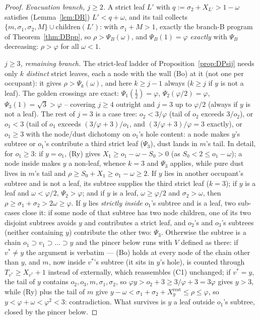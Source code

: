 \documentclass[11pt]{article}
\theoremstyle{definition}
\begin{document}
\begin{proof}
\emph{Evacuation branch, $j\ge2$.} A strict leaf $L'$ with
$q:=\sigma_2+X_{L'}>1-\omega$ satisfies (Lemma~\ref{lem:DR})
$L'<q+\omega$, and its tail collects $\{m,\sigma_1,\sigma_2,M\}\cup
\mathrm{children}(L')$: with $\sigma_1+M>1$, exactly the branch-B
program of Theorem~\ref{thm:DBpp}, so $\rho>\Psi_B(\omega)$, and
$\Psi_B(1)=\varphi$ \emph{exactly} with $\Psi_B$ decreasing:
$\rho>\varphi$ for all $\omega<1$.

\emph{$j\ge3$, remaining branch.} The strict-leaf ladder of
Proposition~\ref{prop:DPsij} needs only $k$ \emph{distinct} strict
leaves, each a node with the wall (Bo) at it (not one per occupant):
it gives $\rho>\Psi_k(\omega)$, and here $k\ge j-1$ always ($k\ge j$ if
$y$ is not a leaf). The golden
crossings are exact: $\Psi_1(\tfrac12)=\varphi$,
$\Psi_2(\varphi/2)=\varphi$, $\Psi_3(1)=\sqrt3>\varphi$ -- covering
$j\ge4$ outright and $j=3$ up to $\varphi/2$ (always if $y$ is not a
leaf). The rest of $j=3$ is a case tree: $o_2<3/\varphi$ (tail of
$o_2$ exceeds $3/o_2$), or $o_1<3$ (tail of $o_1$ exceeds
$(3/\varphi+3)/o_1$, and $(3/\varphi+3)/\varphi=3$ exactly), or
$o_1\ge3$ with the node/dust dichotomy on $o_1$'s hole content: a node
makes $y$'s subtree or $o_1$'s contribute a third strict leaf
($\Psi_3$), dust lands in $m$'s tail. In detail, for $o_1\ge3$: if
$y=o_1$, (Ry) gives $X_1\ge o_1-\omega-S_0>0$ (as $S_0<2\le o_1-\omega$);
a node inside makes $y$ a non-leaf, whence $k=3$ and $\Psi_3$ applies,
while pure dust lives in $m$'s tail and
$\rho\ge S_0+X_1\ge o_1-\omega\ge2$. If $y$ lies in another
occupant's subtree and is not a leaf, its subtree supplies the third
strict leaf ($k=3$); if $y$ is a leaf and $\omega<\varphi/2$,
$\Psi_2>\varphi$; and if $y$ is a leaf, $\omega\ge\varphi/2$ and
$\sigma_2>\omega$, then
$\rho\ge\sigma_1+\sigma_2>2\omega\ge\varphi$. If $y$ lies
\emph{strictly inside} $o_1$'s subtree and is a leaf, two sub-cases
close it: if some node of that subtree has two node children, one of
its two disjoint subtrees avoids $y$ and contributes a strict leaf,
and $o_2$'s and $o_3$'s subtrees (neither containing $y$) contribute
the other two: $\Psi_3$. Otherwise the subtree is a chain
$o_1\supset v_1\supset\dots\supset y$ and the pincer below runs with
$V$ defined as there: if $v^{*}\ne y$ the argument is verbatim ---
(Bo) holds at every node of the chain other than $y$, and $m$, now
inside $v^{*}$'s subtree (it sits in $y$'s hole), is counted through
$T_{v^{*}}\ge X_{v^{*}}+1$ instead of externally, which reassembles
(C1) unchanged; if $v^{*}=y$, the tail of $y$ contains
$o_2,o_3,m,\sigma_1,\sigma_2$, so
$\varphi y>o_2+3\ge3/\varphi+3=3\varphi$ gives $y>3$, while (Ry) plus
the tail of $m$ give
$y-\omega<\sigma_1+\sigma_2+X_y^{\mathrm{rest}}\le\rho\le\varphi$, so
$y<\varphi+\omega<\varphi^2<3$: contradiction. What survives is
$y$ a leaf outside $o_1$'s subtree, closed by the pincer below.


\end{proof}
\end{document}
